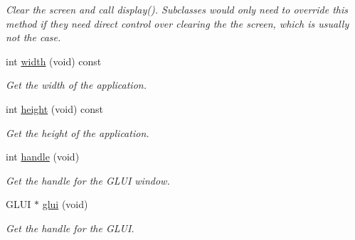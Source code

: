 \begin{DoxyCompactItemize}
\begin{DoxyCompactList}\small\item\em Clear the screen and call display(). Subclasses would only need to override this method if they need direct control over clearing the the screen, which is usually not the case. \end{DoxyCompactList}\item 
int \hyperlink{classimage__tools_1_1BaseGfxApp_a2fe403c5392f624477c2ce4429f1a7b5}{width} (void) const 
\begin{DoxyCompactList}\small\item\em Get the width of the application. \end{DoxyCompactList}\item 
int \hyperlink{classimage__tools_1_1BaseGfxApp_aa961e13a7a8e6062204223cc33ac7503}{height} (void) const 
\begin{DoxyCompactList}\small\item\em Get the height of the application. \end{DoxyCompactList}\item 
int \hyperlink{classimage__tools_1_1BaseGfxApp_a18d458232b04b17d522996101ee0945f}{handle} (void)
\begin{DoxyCompactList}\small\item\em Get the handle for the G\+L\+UI window. \end{DoxyCompactList}\item 
G\+L\+UI $\ast$ \hyperlink{classimage__tools_1_1BaseGfxApp_a780a6702441c4d8c821fb40ede140c71}{glui} (void)
\begin{DoxyCompactList}\small\item\em Get the handle for the G\+L\+UI. \end{DoxyCompactList}\end{DoxyCompactItemize}
